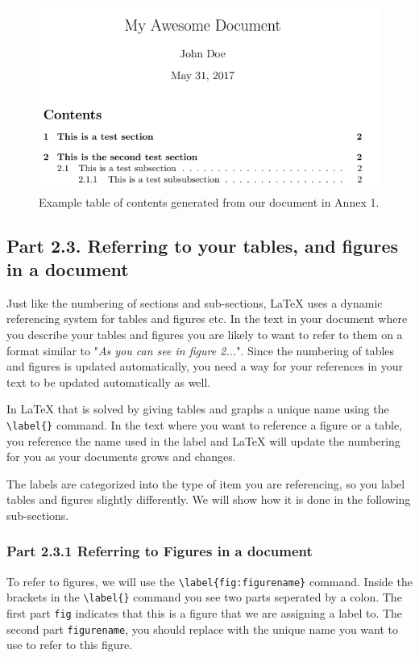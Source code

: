 \documentclass[12pts]{report}
\begin{document}
\begin{figure} [H]
	\centering
	\includegraphics[width=.8\linewidth]{../img/tableofcontents2}
	\caption{Example table of contents generated from our document in Annex 1.}
	\label{fig:tableofcontents}
\end{figure}

\subsection*{Part 2.3. Referring to your tables, and figures in a document}

Just like the numbering of sections and sub-sections, {\LaTeX} uses a dynamic referencing system for tables and figures etc. In the text in your document where you describe your tables and figures you are likely to want to refer to them on a format similar to "\textit{As you can see in figure 2...}". Since the numbering of tables and figures is updated automatically, you need a way for your references in your text to be updated automatically as well.

In {\LaTeX} that is solved by giving tables and graphs a unique name using the \verb|\label{}| command. In the text where you want to reference a figure or a table, you reference the name used in the label and {\LaTeX} will update the numbering for you as your documents grows and changes.

The labels are categorized into the type of item you are referencing, so you label tables and figures slightly differently. We will show how it is done in the following sub-sections.

\subsubsection*{Part 2.3.1 Referring to Figures in a document}
To refer to figures, we will use the \verb|\label{fig:figurename}| command. Inside the brackets in the \verb|\label{}| command you see two parts seperated by a colon. The first part  \texttt{fig} indicates that this is a figure that we are assigning a label to. The second part  \texttt{figurename}, you should replace with the unique name you want to use to refer to this figure.
  
\end{document}

